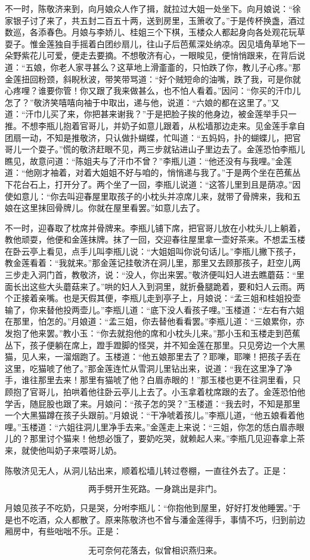 不一时，陈敬济来到，向月娘众人作了揖，就拉过大姐一处坐下。向月娘说：“徐家银子讨了来了，共五封二百五十两，送到房里，玉箫收了。”于是传杯换盏，酒过数巡，各添春色。月娘与李娇儿、桂姐三个下棋，玉楼众人都起身向各处观花玩草耍子。惟金莲独自手摇着白团纱扇儿，往山子后芭蕉深处纳凉。因见墙角草地下一朵野紫花儿可爱，便走去要摘。不想敬济有心，一眼睃见，便悄悄跟来，在背后说道：“五娘，你老人家寻甚么？这草地上滑齑齑的，只怕跌了你，教儿子心疼。”那金莲扭回粉颈，斜睨秋波，带笑带骂道：“好个贼短命的油嘴，跌了我，可是你就心疼哩？谁要你管！你又跟了我来做甚么，也不怕人看着。”因问：“你买的汗巾儿怎了？”敬济笑嘻嘻向袖于中取出，递与他，说道：“六娘的都在这里了。”又道：“汗巾儿买了来，你把甚来谢我？”于是把脸子挨的他身边，被金莲举手只一推。不想李瓶儿抱着官哥儿，并奶子如意儿跟着，从松墙那边走来。见金莲手拿自团扇一动，不知是推敬济，只认做扑蝴蝶，忙叫道：“五妈妈，扑的蝴蝶儿，把官哥儿一个耍子。”慌的敬济赶眼不见，两三步就钻进山子里边去了。金莲恐怕李瓶儿瞧见，故意问道：“陈姐夫与了汗巾不曾？”李瓶儿道：“他还没有与我哩。”金莲道：“他刚才袖着，对着大姐姐不好与咱的，悄悄递与我了。”于是两个坐在芭蕉丛下花台石上，打开分了。两个坐了一回，李瓶儿说道：“这答儿里到且是荫凉。”因使如意儿：“你去叫迎春屋里取孩子的小枕头并凉席儿来，就带了骨牌来，我和五娘在这里抹回骨牌儿。你就在屋里看罢。”如意儿去了。

不一时，迎春取了枕席并骨牌来。李瓶儿铺下席，把官哥儿放在小枕头儿上躺着，教他顽耍，他便和金莲抹牌。抹了一回，交迎春往屋里拿一壶好茶来。不想盂玉楼在卧云亭上看见，点手儿叫李瓶儿说：“大姐姐叫你说句话儿。”李瓶儿撇下孩子，教金莲看着：“我就来。”那金莲记挂敬济在洞儿里，那里又去顾那孩子，赶空儿两三步走入洞门首，教敬济，说：“没人，你出来罢。”敬济便叫妇人进去瞧蘑菇：“里面长出这些大头蘑菇来了。”哄的妇人入到洞里，就折叠腿跪着，要和妇人云雨。两个正接着亲嘴。也是天假其便，李瓶儿走到亭子上，月娘说：“孟三姐和桂姐投壶输了，你来替他投两壶儿。”李瓶儿道：“底下没人看孩子哩。”玉楼道：“左右有六姐在那里，怕怎的。”月娘道：“孟三姐，你去替他看看罢。”李瓶儿道：“三娘累你，亦发抱了他来罢。”教小玉：“你去就抱他的席和小枕头儿来。”那小玉和玉楼走到芭蕉丛下，孩子便躺在席上，蹬手蹬脚的怪哭，并不知金莲在那里。只见旁边一个大黑猫，见人来，一溜烟跑了。玉楼道：“他五娘那里去了？耶嚛，耶嚛！把孩子丢在这里，吃猫唬了他了。”那金莲连忙从雪洞儿里钻出来，说道：“我在这里净了净手，谁往那里去来！那里有猫唬了他？白眉赤眼的！”那玉楼也更不往洞里看，只顾抱了官哥儿，拍哄着他往卧云亭儿上去了。小玉拿着枕席跟的去了。金莲恐怕他学舌，随屁股也跟了来。月娘问：“孩子怎的哭？”玉楼道：“我去时，不知是那里一个大黑猫蹲在孩子头跟前。”月娘说：“干净唬着孩儿。”李瓶儿道，“他五娘看着他哩。”玉楼道：“六姐往洞儿里净手去来。”金莲走上来说：“三姐，你怎的恁白眉赤眼儿的？那里讨个猫来！他想必饿了，要奶吃哭，就赖起人来。”李瓶几见迎春拿上茶来，就使他叫奶子来喂哥儿奶。

陈敬济见无人，从洞儿钻出来，顺着松墙儿转过卷棚，一直往外去了。正是：

\[
两手劈开生死路。一身跳出是非门。
\]


月娘见孩子不吃奶，只是哭，分咐李瓶儿：“你抱他到屋里，好好打发他睡罢。”于是也不吃酒，众人都散了。原来陈敬济也不曾与潘金莲得手，事情不巧，归到前边厢房中，有些咄咄不乐。正是：

\[
无可奈何花落去，似曾相识燕归来。
\]

